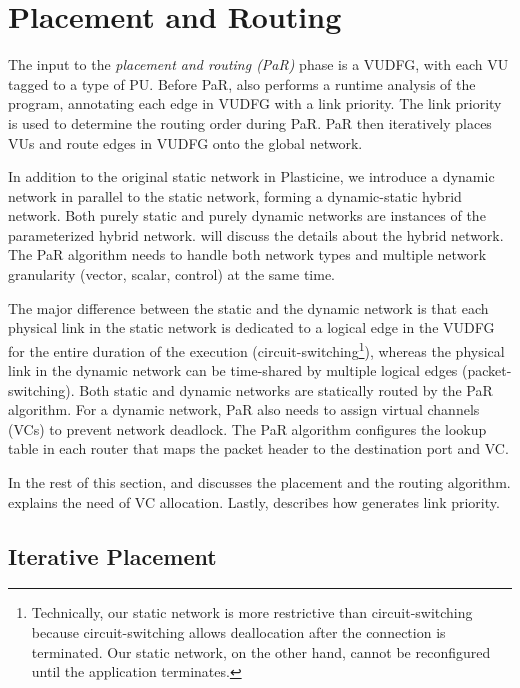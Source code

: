 \section{Placement and Routing} \label{sec:par}
The input to the \emph{placement and routing (PaR)} phase is a VUDFG, with each VU tagged to a type of PU.
Before PaR, \name also performs a runtime analysis of the program, annotating each edge in VUDFG
with a link priority. The link priority is used to determine the routing order during PaR.
PaR then iteratively places VUs and route edges in VUDFG onto the global network.

In addition to the original static network in Plasticine, we introduce a dynamic network in
parallel to the static network, forming a dynamic-static hybrid network.
Both purely static and purely dynamic networks are instances of the parameterized hybrid network.
 will discuss the details about the hybrid network.
The PaR algorithm needs to handle both network types and multiple network granularity (vector,
scalar, control) at the same time.

The major difference between the static and the dynamic network is that each physical link in the static network is dedicated to a logical edge in the VUDFG for the entire duration of the execution
(circuit-switching\footnote{Technically, our static network is more restrictive than
circuit-switching because circuit-switching allows deallocation after the connection is terminated.
Our static network, on the other hand, cannot be reconfigured until the application terminates.}), whereas 
the physical link in the dynamic network can be time-shared by multiple logical edges
(packet-switching).
Both static and dynamic networks are statically routed by the PaR algorithm. 
For a dynamic network, PaR also needs to assign virtual channels (VCs) to prevent network deadlock.
The PaR algorithm configures the lookup table in each router that maps the packet header to the
destination port and VC.

In the rest of this section,  and  discusses the placement 
and the routing algorithm. 
 explains the need of VC allocation. 
Lastly,  describes how \name generates link priority.

\subsection{Iterative Placement} \label{sec:place}

